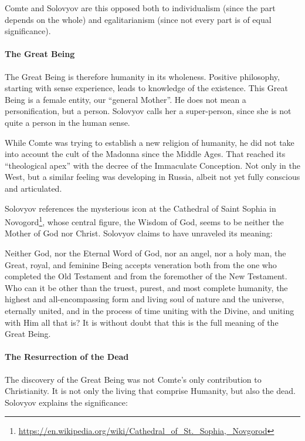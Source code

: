 Comte and Solovyov are this opposed both to individualism (since the part depends on the whole) and egalitarianism (since not every part is of equal significance).

\paragraph{The Great Being}


The Great Being is therefore humanity in its wholeness. Positive philosophy, starting with sense experience, leads to knowledge of the existence. This Great Being is a female entity, our ``general Mother''. He does not mean a personification, but a person. Solovyov calls her a super-person, since she is not quite a person in the human sense.

While Comte was trying to establish a new religion of humanity, he did not take into account the cult of the Madonna since the Middle Ages. That reached its ``theological apex'' with the decree of the Immaculate Conception. Not only in the West, but a similar feeling was developing in Russia, albeit not yet fully conscious and articulated.


Solovyov references the mysterious icon at the Cathedral of Saint Sophia in Novogord\footnote{\url{https://en.wikipedia.org/wiki/Cathedral\_of\_St.\_Sophia,\_Novgorod}}, whose central figure, the Wisdom of God, seems to be neither the Mother of God nor Christ. Solovyov claims to have unraveled its meaning:

\begin{quotex}
Neither God, nor the Eternal Word of God, nor an angel, nor a holy man, the Great, royal, and feminine Being accepts veneration both from the one who completed the Old Testament and from the foremother of the New Testament. Who can it be other than the truest, purest, and most complete humanity, the highest and all-encompassing form and living soul of nature and the universe, eternally united, and in the process of time uniting with the Divine, and uniting with Him all that is? It is without doubt that this is the full meaning of the Great Being.
\end{quotex}


\paragraph{The Resurrection of the Dead}


The discovery of the Great Being was not Comte's only contribution to Christianity. It is not only the living that comprise Humanity, but also the dead. Solovyov explains the significance:

